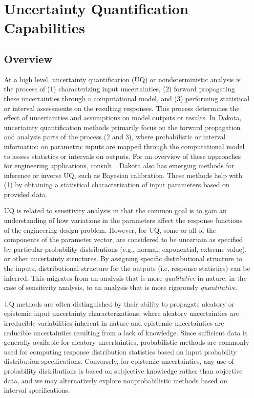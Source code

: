 \chapter{Uncertainty Quantification Capabilities}\label{uq}

\section{Overview}\label{uq:overview}

At a high level, uncertainty quantification (UQ) or nondeterministic
analysis is the process of (1) characterizing input uncertainties, (2)
forward propagating these uncertainties through a computational model,
and (3) performing statistical or interval assessments on the
resulting responses. This process determines the effect of
uncertainties and assumptions on model outputs or results. In Dakota,
uncertainty quantification methods primarily focus on the forward
propagation and analysis parts of the process (2 and 3), where
probabilistic or interval information on parametric inputs are mapped
through the computational model to assess statistics or intervals on
outputs. For an overview of these approaches for engineering
applications, consult~\cite{Hal00}. Dakota also has emerging methods
for inference or inverse UQ, such as Bayesian calibration. These
methods help with (1) by obtaining a statistical characterization of
input parameters based on provided data.

UQ is related to sensitivity analysis in that the common goal is to
gain an understanding of how variations in the parameters affect the
response functions of the engineering design problem. However, for UQ,
some or all of the components of the parameter vector, are considered
to be uncertain as specified by particular probability distributions
(e.g., normal, exponential, extreme value), or other uncertainty
structures. By assigning specific distributional structure to the
inputs, distributional structure for the outputs (i.e, response
statistics) can be inferred.  This migrates from an analysis that is
more {\em qualitative} in nature, in the case of sensitivity analysis,
to an analysis that is more rigorously {\em quantitative}.

UQ methods are often distinguished by their ability to propagate
aleatory or epistemic input uncertainty characterizations, where
aleatory uncertainties are irreducible variabilities inherent in
nature and epistemic uncertainties are reducible uncertainties
resulting from a lack of knowledge. Since sufficient data is generally
available for aleatory uncertainties, probabilistic methods are
commonly used for computing response distribution statistics based on
input probability distribution specifications. Conversely, for
epistemic uncertainties, any use of probability distributions is based
on subjective knowledge rather than objective data, and we may
alternatively explore nonprobabilistic methods based on interval
specifications.

